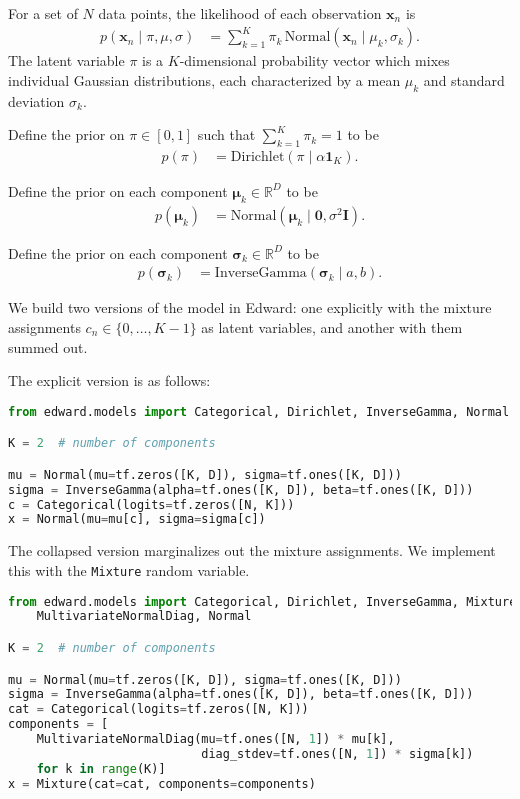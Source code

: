 For a set of $N$ data points,
the likelihood of each observation $\mathbf{x}_n$ is
\begin{align*}
  p(\mathbf{x}_n \mid \pi, \mu, \sigma)
  &=
  \sum_{k=1}^K \pi_k \, \text{Normal}(\mathbf{x}_n \mid \mu_k, \sigma_k).
\end{align*}
The latent variable $\pi$ is a $K$-dimensional probability vector
which mixes individual Gaussian distributions, each
characterized by a mean $\mu_k$ and standard deviation $\sigma_k$.

Define the prior on $\pi\in[0,1]$ such that $\sum_{k=1}^K\pi_k=1$ to be
\begin{align*}
  p(\pi)
  &=
  \text{Dirichlet}(\pi \mid \alpha \mathbf{1}_{K}).
\end{align*}

Define the prior on each component $\mathbf{\mu}_k\in\mathbb{R}^D$ to be
\begin{align*}
  p(\mathbf{\mu}_k)
  &=
  \text{Normal}(\mathbf{\mu}_k \mid \mathbf{0}, \sigma^2\mathbf{I}).
\end{align*}

Define the prior on each component $\mathbf{\sigma}_k\in\mathbb{R}^D$ to be
\begin{align*}
  p(\mathbf{\sigma}_k)
  &=
  \text{InverseGamma}(\mathbf{\sigma}_k \mid a, b).
\end{align*}

We build two versions of the model in Edward: one explicitly with the
mixture assignments $c_n\in\{0,\ldots,K-1\}$ as latent variables,
and another with them summed out.

The explicit version is as follows:

\begin{lstlisting}[language=Python]
from edward.models import Categorical, Dirichlet, InverseGamma, Normal

K = 2  # number of components

mu = Normal(mu=tf.zeros([K, D]), sigma=tf.ones([K, D]))
sigma = InverseGamma(alpha=tf.ones([K, D]), beta=tf.ones([K, D]))
c = Categorical(logits=tf.zeros([N, K]))
x = Normal(mu=mu[c], sigma=sigma[c])
\end{lstlisting}

The collapsed version marginalizes out the mixture assignments. We
implement this with the \texttt{Mixture} random variable.

\begin{lstlisting}[language=Python]
from edward.models import Categorical, Dirichlet, InverseGamma, Mixture, \
    MultivariateNormalDiag, Normal

K = 2  # number of components

mu = Normal(mu=tf.zeros([K, D]), sigma=tf.ones([K, D]))
sigma = InverseGamma(alpha=tf.ones([K, D]), beta=tf.ones([K, D]))
cat = Categorical(logits=tf.zeros([N, K]))
components = [
    MultivariateNormalDiag(mu=tf.ones([N, 1]) * mu[k],
                           diag_stdev=tf.ones([N, 1]) * sigma[k])
    for k in range(K)]
x = Mixture(cat=cat, components=components)
\end{lstlisting}

